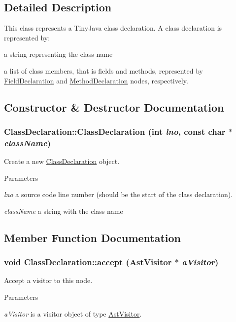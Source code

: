 \subsection{Detailed Description}
This class represents a TinyJava class declaration. A class declaration is represented by:
\begin{DoxyItemize}
\item a string representing the class name
\item a list of class members, that is fields and methods, represented by \hyperlink{classFieldDeclaration}{FieldDeclaration} and \hyperlink{classMethodDeclaration}{MethodDeclaration} nodes, respectively. 
\end{DoxyItemize}

\subsection{Constructor \& Destructor Documentation}
\hypertarget{classClassDeclaration_a1016b2f9166666f12ff69d8f35c5f4b0}{
\subsubsection[{ClassDeclaration}]{\setlength{\rightskip}{0pt plus 5cm}ClassDeclaration::ClassDeclaration (int {\em lno}, \/  const char $\ast$ {\em className})}}
\label{classClassDeclaration_a1016b2f9166666f12ff69d8f35c5f4b0}
Create a new \hyperlink{classClassDeclaration}{ClassDeclaration} object.


\begin{DoxyParams}{Parameters}
\item[{\em lno}]a source code line number (should be the start of the class declaration). \item[{\em className}]a string with the class name \end{DoxyParams}


\subsection{Member Function Documentation}
\hypertarget{classClassDeclaration_abb1e806c4c54cfecbc685b5c8a072eae}{
\subsubsection[{accept}]{\setlength{\rightskip}{0pt plus 5cm}void ClassDeclaration::accept ({\bf AstVisitor} $\ast$ {\em aVisitor})}}
\label{classClassDeclaration_abb1e806c4c54cfecbc685b5c8a072eae}
Accept a visitor to this node. 
\begin{DoxyParams}{Parameters}
\item[{\em aVisitor}]is a visitor object of type \hyperlink{classAstVisitor}{AstVisitor}. \end{DoxyParams}


